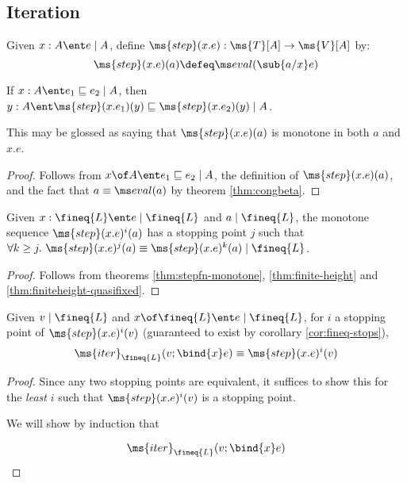 \documentclass{article}
\newcommand{\ale}{\sqsubseteq}
\newcommand{\iter}[4]{\ms{iter}_{#1}({#2}; \bind{#3}#4)}
\newcommand{\lr}[2]{#2\mathrel{|}#1}
\newcommand{\lrcx}[3]{#1 \ent \lr{#2}{#3}}
\newcommand{\lrof}[1]{\ms{T}[#1]}
\newcommand{\Val}[1]{\ms{V}[#1]}
\begin{document}

\subsection{Iteration}

\newcommand{\stepfn}{\ms{step}}

\begin{definition}
  Given $\lrcx{x:A}{A}{e}$, define $\stepfn(x.e) : \lrof{A} \to \Val{A}$
  by: \[\stepfn(x.e)(a) \defeq \evalfn(\sub{a/x} e)\]
\end{definition}

\begin{theorem}\label{thm:stepfn-monotone}
  If $\lrcx{x:A}{A}{e_1 \ale e_2}$, then $\lrcx{y:A}{A}{\stepfn(x.e_1)(y) \ale
    \stepfn(x.e_2)(y)}$.
\end{theorem}
This may be glossed as saying that $\stepfn(x.e)(a)$ is monotone in both $a$ and
$x.e$.

\begin{proof}
  Follows from $\lrcx{x\of A}{A}{e_1 \ale e_2}$, the definition of
  $\stepfn(x.e)(a)$, and the fact that $a \equiv \evalfn(a)$ by theorem
  \ref{thm:congbeta}.
\end{proof}

\begin{corollary}\label{cor:fineq-stops}
  Given $\lrcx{x:\fineq{L}}{\fineq{L}}{e}$ and $\lr{\fineq{L}}{a}$, the monotone
  sequence $\stepfn(x.e)^i(a)$ has a stopping point $j$ such that $\forall k \ge
  j.\ \lr{\fineq{L}}{\stepfn(x.e)^j(a) \equiv \stepfn(x.e)^{k}(a)}$.
\end{corollary}
\begin{proof}
  Follows from theorems \ref{thm:stepfn-monotone}, \ref{thm:finite-height} and
  \ref{thm:finiteheight-quasifixed}.
\end{proof}

\begin{theorem}\label{thm:iter-stops}
  Given $\lr{\fineq{L}}{v}$ and $\lrcx{x\of\fineq{L}}{\fineq{L}}{e}$, for $i$ a
  stopping point of $\stepfn(x.e)^i(v)$ (guaranteed to exist by corollary
  \ref{cor:fineq-stops}),
  \[ \iter{\fineq{L}}{v}{x}{e} \equiv \stepfn(x.e)^i(v) \]
\end{theorem}
\begin{proof}
  Since any two stopping points are equivalent, it suffices to show this for the
  \emph{least} $i$ such that $\stepfn(x.e)^i(v)$ is a stopping point.

  We will show by induction that

  \[
  \iter{\fineq{L}}{v}{x}{e}
  \]

  \TODO

\end{proof}
\end{document}
